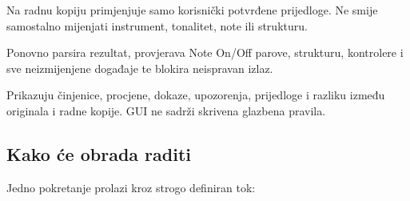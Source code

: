 \documentclass[11pt]{article}
\begin{document}
\begin{description}[style=nextline]
    \item[Change Engine]
    Na radnu kopiju primjenjuje samo korisnički potvrđene prijedloge. Ne smije
    samostalno mijenjati instrument, tonalitet, note ili strukturu.

    \item[Verifier]
    Ponovno parsira rezultat, provjerava Note On/Off parove, strukturu,
    kontrolere i sve neizmijenjene događaje te blokira neispravan izlaz.

    \item[Report i GUI]
    Prikazuju činjenice, procjene, dokaze, upozorenja, prijedloge i razliku
    između originala i radne kopije. GUI ne sadrži skrivena glazbena pravila.
\end{description}

\subsection{Kako će obrada raditi}

Jedno pokretanje prolazi kroz strogo definiran tok:
\end{document}
